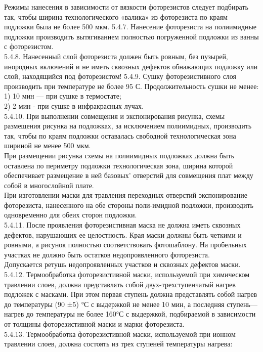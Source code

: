 \documentclass{bmstu}
\begin{document}
	Режимы нанесения в зависимости от вязкости фоторезистов следует подбирать так, чтобы ширина технологического «валика» из фоторезиста по краям подложки была не более 500 мкм.
	5.4.7. Нанесение фоторезиста на полиимидные подложки производить вытягиванием полностью погруженной подложки из ванны с фоторезистом. \\
	5.4.8. Нанесенный слой фоторезиста должен быть ровным, без пузырей, инородных включений и не иметь сквозных дефектов обнажающих подложку или слой, находящийся под фоторезистом!
	5.4.9. Сушку фоторезистивного слоя производить при температуре не более 95 С. Продолжительность сушки не менее: \\
	1) 10 мин — при сушке в термостате; \\
	2) 2 мин - при сушке в инфракрасных лучах. \\
	5.4.10. При выполнении совмещения и экспонирования рисунка, схемы размещения рисунка на подложках, за исключением полиимидных, производить так, чтобы по краям подложки оставалась свободной технологическая зона шириной не менее 500 мкм. \\
	При размещении рисунка схемы на полиимидных подложках должна быть оставлена по периметру подложки технологическая зона, ширина которой обеспечивает размещение в ней базовых' отверстий для совмещения плат между собой в многослойной плате. \\
	При изготовлении маски для травления переходных отверстий экспонирование фоторезиста, нанесенного на обе стороны поли-имидной подложки, производить одновременно для обеих сторон подложки. \\
	5.4.11. После проявления фоторезистивная маска не должна иметь сквозных дефектов, нарушающих ее целостность. Края маски должны быть четкими и ровными, а рисунок полностью соответствовать фотошаблону. На пробельных участках не должно быть остатков недопроявленного фоторезиста. \\
	Допускается ретушь недопроявленных участков и сквозных дефектов маски. \\
	5.4.12. Термообработка фоторезистивной маски, используемой при химическом травлении слоев, должна представлять собой двух-трехступенчатый нагрев подложек с масками. При этом первая ступень должна представлять собой нагрев до температуры (90 ±5) °С с выдержкой не менее 10 мин, а последняя ступень—нагрев до температуры не более 160°С с выдержкой, подбираемой в зависимости от толщины фоторезистивной маски и марки фоторезиста. \\
	5.4.13. Термообработка фоторезистивной маски, используемой при ионном травлении слоев, должна состоять из трех ступеней температуры нагрева: \\
\end{document}

